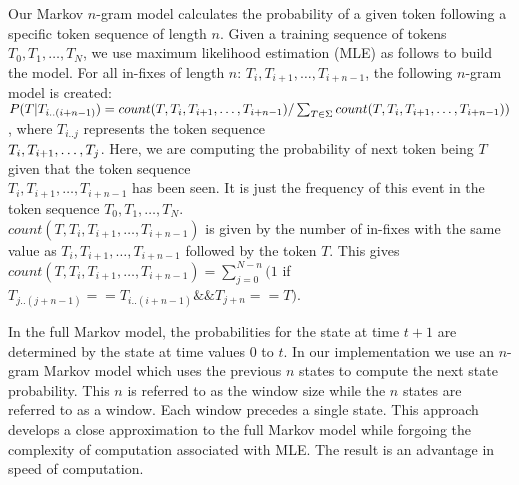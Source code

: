 Our Markov $n$-gram model calculates the probability of a given token following a specific 
token sequence of length $n$.
Given a training sequence of tokens $T_0, T_1, \dots , T_N$,
we use maximum likelihood estimation (MLE) as follows to build the model.
For all in-fixes of
length $n$: $T_i, T_{i+1}, \dots , T_{i+n-1}$,
the following $n$-gram model is created:
$P(T | T_{i..(i+n-1)}) =  count(T, T_i, T_{i+1}, \dots , T_{i+n-1})/\sum_{T \in \Sigma} count(
T, T_i, T_{i+1}, \dots , \\T_{i+n-1}))$, where $T_{i..j}$ represents the
token sequence \\
$T_i, T_{i+\\1}, \dots, T_j$.
Here, we are computing the probability of next token being $T$
given that the token sequence \\
$T_i, T_{i+1}, \dots , T_{i+n-1}$ has been seen.
It is just the
frequency of this event in the token sequence $T_0, T_1, \dots , T_N$. \\
$count(T, T_i, T_{i+1}, \dots , T_{i+n-1})$ is given by the number of in-fixes with the same value as
$T_i, T_{i+1}, \dots , T_{i+n-1}$ followed by the token $T$. This gives 
$count(T, T_i, T_{i+1}, \dots , T_{i+n-1}) = \sum_{j=0}^{N-n}(1$ if $T_{j..(j+n-1)} == T_{i..(i+n-1)} \&\&
T_{j+n} == T)$.

In the full Markov model,
the probabilities for the state at time $t+1$
are determined by the state at time values $0$ to $t$.
In our implementation we use an
$n$-gram Markov model which uses the
previous $n$ states to compute the
next state probability.
This $n$ is referred to as the window size
while the $n$ states are
referred to as a window.
Each window precedes a single state.
%
%
This approach develops a close approximation
to the full Markov model while
forgoing the complexity of computation
associated with MLE.
The result is an advantage in 
speed of computation.

